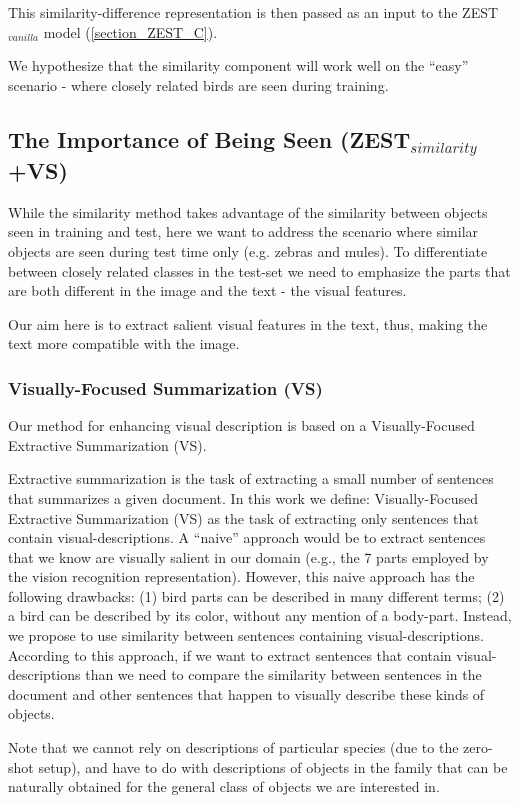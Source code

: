 \documentclass[11pt,a4paper]{article}
\begin{document}
This similarity-difference representation is then passed as an input to the ZEST$_{vanilla}$ model (\ref{section_ZEST_C}). \par

We hypothesize that the similarity component will work well on the \enquote{easy} scenario - where closely related birds are seen during training. \par

\subsection{The Importance of Being Seen (ZEST$_{similarity}$+VS)}

While the similarity method takes advantage of the similarity between objects seen in training and test, here we want to address the scenario where similar objects are seen during test time only (e.g. zebras and mules). To differentiate between closely related classes in the test-set we need to emphasize the parts that are both different in the image and the text - the visual features. \par

Our aim here is to extract salient visual features in the text, thus, making the text more compatible with the image. 

 \par
 
\subsubsection{Visually-Focused Summarization (VS)}


Our method for enhancing visual description is based on a Visually-Focused Extractive Summarization (VS).

Extractive summarization is the task of extracting a small number of sentences that summarizes a given document.
In this work we define: Visually-Focused Extractive Summarization (VS) as the task of extracting only sentences that contain visual-descriptions. A \enquote{naive} approach would be to extract sentences that we know are visually salient in our domain (e.g., the 7 parts employed by the vision recognition representation).  However, this naive approach has the following drawbacks: (1) bird parts can be described in many different terms; (2) a bird can be described by its color, without any mention of a body-part. 
Instead, we propose to use similarity between sentences containing visual-descriptions. According to this approach, if we want to extract sentences that contain visual-descriptions than we need to compare the similarity between sentences in the document and other sentences that happen to visually describe these kinds of objects. 
\par
Note that we cannot rely on descriptions of particular species (due to the zero-shot setup), and have to do with descriptions of objects in the family that can be naturally obtained for the general class of objects we are interested in.\par
\end{document}
